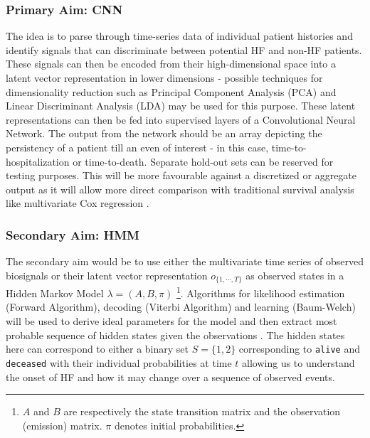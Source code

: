 \documentclass[%
 reprint,
 amsmath,amssymb,
 aps,
 nofootinbib,
]{revtex4-2}
\theoremstyle{definition}
\begin{document}
\subsubsection{\label{prim}Primary Aim: CNN}
The idea is to parse through time-series data of individual patient histories and identify signals that can discriminate between potential HF and non-HF patients. These signals can then be encoded from their high-dimensional space into a latent vector representation in lower dimensions - possible techniques for dimensionality reduction such as Principal Component Analysis (PCA) \cite{PCA} and Linear Discriminant Analysis (LDA) \cite{xanthopoulos2013linear} may be used for this purpose. These latent representations can then be fed into supervised layers of a Convolutional Neural Network. The output from the network should be an array depicting the persistency of a patient till an even of interest - in this case, time-to-hospitalization or time-to-death. Separate hold-out sets can be reserved for testing purposes. This will be more favourable against a discretized or aggregate output as it will allow more direct comparison with traditional survival analysis like multivariate Cox regression \citep{lin1994cox}.
\subsubsection{\label{sec}Secondary Aim: HMM}
The secondary aim would be to use either the multivariate time series of observed biosignals or their latent vector representation $o_{\{1,\cdots,T\}}$ as observed states in a Hidden Markov Model $\lambda = (A,B,\pi)$ \footnote{$A$ and $B$ are respectively the state transition matrix and the observation (emission) matrix. $\pi$ denotes initial probabilities.}. Algorithms for likelihood estimation (Forward Algorithm), decoding (Viterbi Algorithm) and learning (Baum-Welch) will be used to derive ideal parameters for the model and then extract most probable sequence of hidden states given the observations \citep{keselj2009speech}. The hidden states here can correspond to either a binary set $S = \{1 , 2\}$ corresponding to \texttt{alive} and \texttt{deceased} with their individual probabilities at time $t$ allowing us to understand the onset of HF and how it may change over a sequence of observed events.
\end{document}
